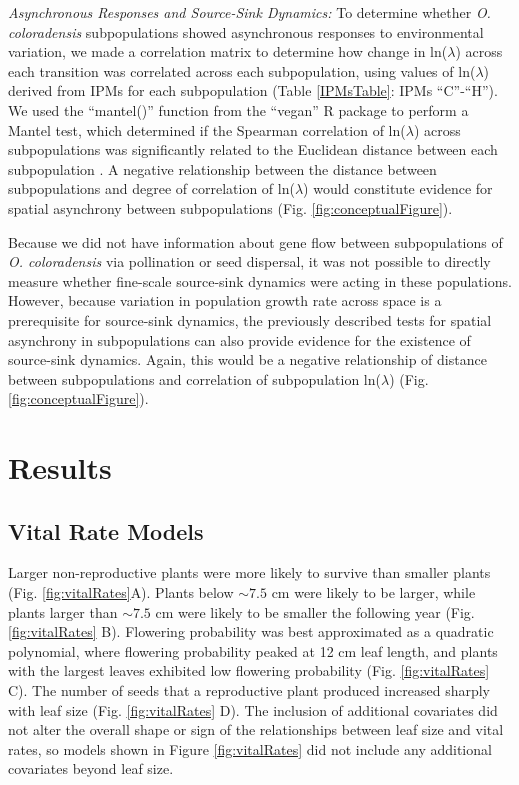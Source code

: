 \documentclass[12pt, letterpaper]{article}
\begin{document}
\textit{Asynchronous Responses and Source-Sink Dynamics:} To determine whether \textit{O. coloradensis} subpopulations showed asynchronous responses to environmental variation, we made a correlation matrix to determine how change in ln($\lambda$) across each transition was correlated across each subpopulation, using values of ln($\lambda$) derived from IPMs for each subpopulation (Table \ref{IPMsTable}: IPMs “C”-“H”). We used the “mantel()” function from the “vegan” R package to perform a Mantel test, which determined if the Spearman correlation of ln($\lambda$) across subpopulations was significantly related to the Euclidean distance between each subpopulation \cite{Oksanen2020Vegan:Package}. A negative relationship between the distance between subpopulations and degree of correlation of ln($\lambda$) would constitute evidence for spatial asynchrony between subpopulations (Fig. \ref{fig:conceptualFigure}).   

Because we did not have information about gene flow between subpopulations of \textit{O. coloradensis} via pollination or seed dispersal, it was not possible to directly measure whether fine-scale source-sink dynamics were acting in these populations. However, because variation in population growth rate across space is a prerequisite for source-sink dynamics, the previously described tests for spatial asynchrony in subpopulations can also provide evidence for the existence of source-sink dynamics. Again, this would be a negative relationship of distance between subpopulations and correlation of subpopulation ln($\lambda$) (Fig. \ref{fig:conceptualFigure}).  
 
\section{Results}

\subsection{Vital Rate Models} 

Larger non-reproductive plants were more likely to survive than smaller plants (Fig. \ref{fig:vitalRates}A). Plants below $\sim7.5$ cm were likely to be larger, while plants larger than $\sim7.5$ cm were likely to be smaller the following year (Fig. \ref{fig:vitalRates} B). Flowering probability was best approximated as a quadratic polynomial, where flowering probability peaked at 12 cm leaf length, and plants with the largest leaves exhibited low flowering probability (Fig. \ref{fig:vitalRates} C). The number of seeds that a reproductive plant produced increased sharply with leaf size (Fig. \ref{fig:vitalRates} D). The inclusion of additional covariates did not alter the overall shape or sign of the relationships between leaf size and vital rates, so models shown in Figure \ref{fig:vitalRates} did not include any additional covariates beyond leaf size.  
\end{document}
